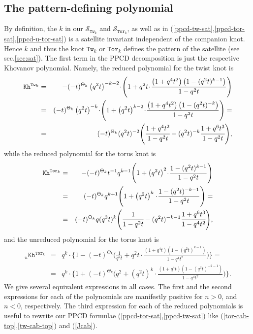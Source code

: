 \documentclass[11pt]{article}
\def\be{\begin{eqnarray}}
\def\ee{\end{eqnarray}}
\def\nn{\nonumber}
\def\Sm{\mathcal{S}}
\def\Kh{\mathtt{Kh}}
\def\Tor{\mathtt{Tor}}
\def\Tw{\mathtt{Tw}}
\begin{document}
\subsection{The pattern-defining polynomial\label{sec:patt-pol}}
By definition, the $k$ in our $\Sm_{\Tw_k}$ and $\Sm_{\Tor_k}$, as well as in (\ref{ppcd-tw-sat},\ref{ppcd-tor-sat},\ref{ppcd-u-tor-sat}) is a satellite invariant independent of the companion knot. Hence $k$ and thus the knot $\Tw_k$ or $\Tor_k$ defines the pattern of the satellite (see sec.\ref{sec:sat}). The first term in the PPCD decomposition is just the respective Khovanov polynomial.  
Namely, the reduced polynomial for the twist knot is 
\be
\Kh^{\Tw_k}&=&-(-t)^{\Theta_{k}}\left(q^2t\right)^{-k-2}\!\cdot\!
\Bigg(1+q^2t\!\cdot\!\frac{\left(1+q^4t^2\right)\left(1-(q^2t)^{k-1}\right)}{1-q^2t}
\Bigg)\label{Kh-tw}\\\nn
&=&
(-t)^{\Theta_{k}}\left(q^2t\right)^{-k}\!\cdot\!
\Bigg(1+\left(q^2t\right)^{k-2}\!\cdot\!\frac{\left(1+q^4t^2\right)\left(1-(q^2t)^{-k}\right)}{1-q^2t}
\Bigg)=\\
&=&
(-t)^{\Theta_k}(q^2t)^{-2}\Bigg(\cfrac{1+q^4t^2}{1-q^2t}-(q^2t)^{-k}\cfrac{1+q^6t^3}{1-q^2t}
\Bigg),
\nn\ee
while the reduced polynomial for the torus knot is 
\be
\Kh^{\Tor_k}&=&
-(-t)^{\Theta_{k}}t^{-1}q^{k-1}\Bigg(1+\left(q^2t\right)^2\!\cdot\!\frac{1-(q^2t)^{k-1}}{1-q^2t}
\Bigg)\label{Kh-tor}\\\nn&=&
(-t)^{\Theta_{k}}q^{k+1}\Bigg(1+\left(q^2t\right)^k\cdot\!\frac{1-(q^2t)^{-k-1}}{1-q^2t}
\Bigg)=\\
&=&(-t)^{\Theta_k}q(q^3t)^k\Bigg(\cfrac{1}{1-q^2t}-(q^2t)^{-k-1}\cfrac{1+q^6t^3}{1-q^4t^2}\Bigg),
\nn\ee
and the unreduced polynomial for the torus knot is
\be
{{}_u\Kh}^{\Tor_k}&=&
q^k\!\cdot\!\Bigg\{1-(-t)^{\Theta_{k}}\Bigg(\frac{1}{q^2t}+q^2t\!\cdot\!\frac{\left(1+q^4t\right)\left(1-(q^2t)^{k-1}\right)}{1-q^4t^2}\Bigg)\Bigg\}=\\&=&
q^k\!\cdot\!\Bigg\{1+(-t)^{\Theta_{k}}\Bigg(q^2+\left(q^2t\right)^k\!\cdot\!\frac{\left(1+q^4t\right)\left(1-(q^2t)^{-k-1}\right)}{1-q^4t^2}\Bigg)\Bigg\}.\nn\ee
We give several equivalent expressions in all cases.
The first and the second expressions for each of the polynomials are manifestly positive for $n>0$, and $n<0$, respectively. The third expression for each of the reduced polynomials is useful to rewrite our PPCD formulae (\ref{ppcd-tor-sat},\ref{ppcd-tw-sat}) like (\ref{tor-cab-top},\ref{tw-cab-top}) and (\ref{Jcab}).
\end{document}
